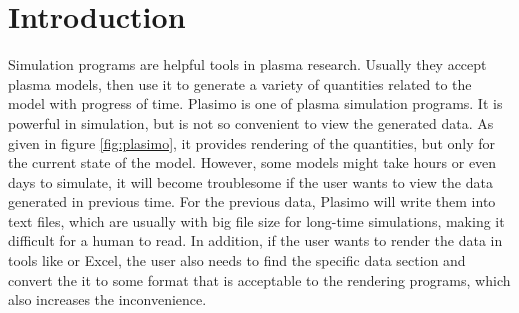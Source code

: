 \def\projectinfoleft{
  Author: \\
  Project Supervisor: \\
  Project Assessor:
}
\def\projectinforight{
  Juntong Liu (201219267) \\
  Dr Mark Bowden \\
  Dr James Walsh
}
\def\studentname{
  \texttt{[image: signature]}}
\def\reporttitle{
  \bf Final Report for Project: \\Development of a C++ User-interface\\ for a Plasma Simulation Tool}
\def\theabstract{ %
In this project, a program is developed to view data generated in plasma simulations with options to export the data into images and videos, then further expanded to be a general purposed data viewing tool. The development uses C++ as the main language, with a plugin system implemented in Python. The implementation of user interface uses Qt as framework, and provides diagram rendering in 2D and 3D space using OpenGL. This article describes the design of the project, then focuses on the implementation of the framework, including test results of libraries used in this project. Afterwards, overview of the program is given and output files is compared to files generated by other programs. Finally, suggestions for future improvements are given for reference.
}


\usepackage[super]{nth}
\usepackage{pdfpages}



\section{Introduction}

Simulation programs are helpful tools in plasma research. Usually they accept plasma models, then use it to generate a variety of quantities related to the model with progress of time. Plasimo is one of plasma simulation programs. It is powerful in simulation, but is not so convenient to view the generated data. As given in figure \ref{fig:plasimo}, it provides rendering of the quantities, but only for the current state of the model. However, some models might take hours or even days to simulate, it will become troublesome if the user wants to view the data generated in previous time. For the previous data, Plasimo will write them into text files, which are usually with big file size for long-time simulations, making it difficult for a human to read. In addition, if the user wants to render the data in tools like \MatLab{} or Excel, the user also needs to find the specific data section and convert the it to some format that is acceptable to the rendering programs, which also increases the inconvenience.

